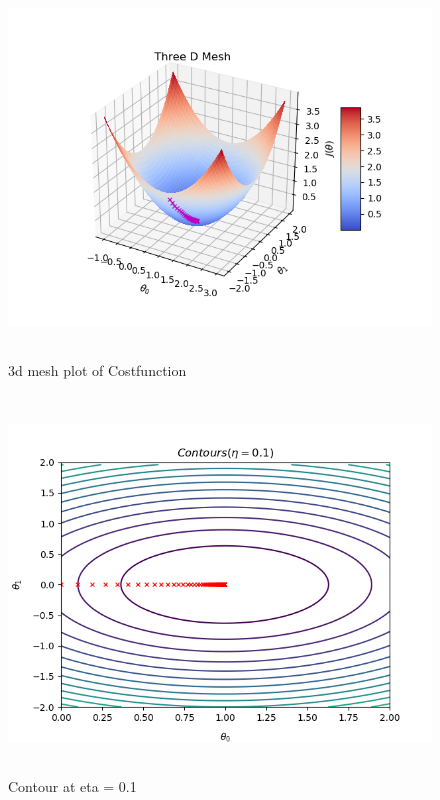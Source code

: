 \documentclass[10pt]{article}
\begin{document}
\begin{figure}[H]
	\includegraphics[width = 15cm,height = 10cm]{Q1_c}
	\caption{3d mesh plot of Costfunction}
\end{figure}


\begin{figure}[H]
	\includegraphics[width = 15cm,height = 10cm]{Q1_d01}
	\caption{Contour at eta = 0.1}
\end{figure}
\end{document}
